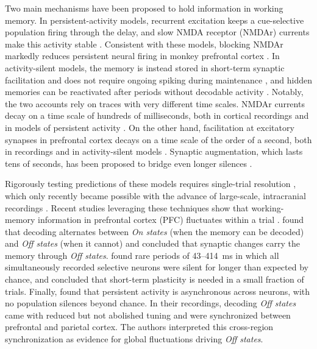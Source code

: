 \documentclass[11pt]{article}
\begin{document}
Two main mechanisms have been proposed to hold information in working memory. In persistent-activity models, recurrent excitation keeps a cue-selective population firing through the delay, and slow NMDA receptor (NMDAr) currents make this activity stable \citep{amit1997,wang1999,wang2001,compte2000}. Consistent with these models, blocking NMDAr markedly reduces persistent neural firing in monkey prefrontal cortex \citep{wangm2013}. In activity-silent models, the memory is instead stored in short-term synaptic facilitation and does not require ongoing spiking during maintenance \citep{mongillo2008,stokes2015,lundqvist2016,miller2018,panichello2024}, and hidden memories can be reactivated after periods without decodable activity \citep{rose2016,wolff2017,barbosa2020}. Notably, the two accounts rely on traces with very different time scales. NMDAr currents decay on a time scale of hundreds of milliseconds, both in cortical recordings \citep{vicini1998,wangh2008} and in models of persistent activity \citep{wang1999,compte2000}. On the other hand, facilitation at excitatory synapses in prefrontal cortex decays on a time scale of the order of a second, both in recordings \citep{thomson1997,markram1998,hempel2000,wangy2006} and in activity-silent models \citep{mongillo2008}. Synaptic augmentation, which lasts tens of seconds, has been proposed to bridge even longer silences \citep{mongillo2025}.

Rigorously testing predictions of these models requires single-trial resolution \citep{lundqvist2018}, which only recently became possible with the advance of large-scale, intracranial recordings \citep{williams2021,urai2022}. Recent studies leveraging these techniques show that working-memory information in prefrontal cortex (PFC) fluctuates within a trial \citep{panichello2024,tao2024,mozumder2026}. \citet{panichello2024} found that decoding alternates between \emph{On states} (when the memory can be decoded) and \emph{Off states} (when it cannot) and concluded that synaptic changes carry the memory through \emph{Off states}. \citet{tao2024} found rare periods of 43--414~ms in which all simultaneously recorded selective neurons were silent for longer than expected by chance, and concluded that short-term plasticity is needed in a small fraction of trials. Finally, \citet{mozumder2026} found that persistent activity is asynchronous across neurons, with no population silences beyond chance. In their recordings, decoding \emph{Off states} came with reduced but not abolished tuning and were synchronized between prefrontal and parietal cortex. The authors interpreted this cross-region synchronization as evidence for global fluctuations driving \emph{Off states}.
\end{document}
